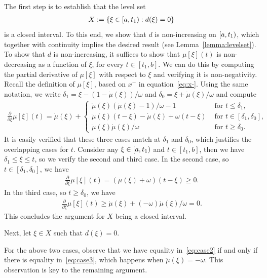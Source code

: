 \documentclass[a4paper]{article}
\theoremstyle{definition}
\theoremstyle{plain}
\begin{document}
The first step is to establish that the level set
\begin{align}
  X := \{ \xi \in [a,t_{1}) : d(\xi) = 0 \}
\end{align}
is a closed interval. To this end, we show that $d$ is non-increasing on
$[a,t_{1})$, which together with continuity implies the desired result
(see Lemma~\ref{lemma:levelset}).
%
To show that $d$ is non-increasing, it suffices to show that $\mu[\xi](t)$ is
non-decreasing as a function of $\xi$, for every $t \in [t_{1}, b]$.
%
We can do this by computing the partial derivative of $\mu[\xi]$ with respect to $\xi$
and verifying it is non-negativity.
%
Recall the definition of $\mu[\xi]$, based on $x^{-}$ in equation~\eqref{eq:x-}.
%
Using the same notation, we write
$\delta_{1} = \xi - (1 - \dot{\mu}(\xi))/\omega$ and
$\delta_{0} = \xi + \dot{\mu}(\xi)/\omega$ and compute
%
\begin{align}
  \frac{\partial}{\partial \xi} \mu[\xi](t) =
  \dot{\mu}(\xi) +
  \begin{cases}
    \ddot{\mu}(\xi)(\dot{\mu}(\xi)-1)/\omega - 1 &\text{ for } t \leq \delta_{1} , \\
    \ddot{\mu}(\xi)(t-\xi) - \dot{\mu}(\xi) + \omega(t-\xi) &\text{ for } t \in [\delta_{1},\delta_{0}] , \\
    \ddot{\mu}(\xi)\dot{\mu}(\xi)/ \omega &\text{ for } t \geq \delta_{0} .
  \end{cases}
\end{align}
%
It is easily verified that these three cases match at $\delta_{1}$ and $\delta_{0}$, which
justifies the overlapping cases for $t$.
%
Consider any $\xi \in [a,t_{1})$ and $t \in [t_{1}, b]$, then we have $\delta_{1} \leq \xi \leq t$,
so we verify the second and third case.
%
In the second case, so $t \in [\delta_{1},\delta_{0}]$, we have
\begin{align}\label{eq:case2}
  \frac{\partial}{\partial \xi} \mu[\xi](t) = (\ddot{\mu}(\xi) + \omega)(t-\xi) \geq 0 .
\end{align}
%
In the third case, so $t \geq \delta_{0}$, we have
\begin{align}\label{eq:case3}
  \frac{\partial}{\partial \xi} \mu[\xi](t) \geq \dot{\mu}(\xi) + (-\omega)\dot{\mu}(\xi)/\omega = 0 .
\end{align}
This concludes the argument for $X$ being a closed interval.

Next, let $\xi \in X$ such that $d(\xi) = 0$.

For the above two cases, observe that we have equality in~\eqref{eq:case2} if
and only if there is equality in~\eqref{eq:case3}, which happens when
$\ddot{\mu}(\xi) = -\omega$.
%
This observation is key to the remaining argument.
\end{document}
